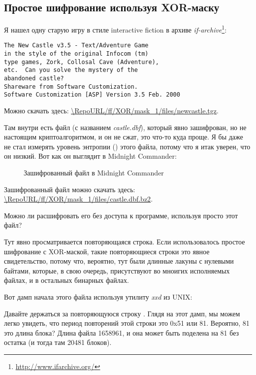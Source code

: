 \subsection{Простое шифрование используя XOR-маску}
\label{XOR_mask_1}

Я нашел одну старую игру в стиле interactive fiction в архиве \emph{if-archive}\footnote{\url{http://www.ifarchive.org/}}:

\begin{lstlisting}
The New Castle v3.5 - Text/Adventure Game
in the style of the original Infocom (tm)
type games, Zork, Collosal Cave (Adventure),
etc.  Can you solve the mystery of the
abandoned castle?
Shareware from Software Customization.
Software Customization [ASP] Version 3.5 Feb. 2000
\end{lstlisting}

Можно скачать здесь: \url{\RepoURL/ff/XOR/mask_1/files/newcastle.tgz}.

Там внутри есть файл (с названием \emph{castle.dbf}), который явно зашифрован, но не настоящим криптоалгоритмом,
и он не сжат, это что-то куда проще.
Я бы даже не стал измерять уровень энтропии () этого файла, потому что я итак уверен, что он низкий.
Вот как он выглядит в Midnight Commander:

\begin{figure}[H]
\centering
{}
\caption{Зашифрованный файл в Midnight Commander}
\end{figure}

Зашифрованный файл можно скачать здесь:
\url{\RepoURL/ff/XOR/mask_1/files/castle.dbf.bz2}.

Можно ли расшифровать его без доступа к программе, используя просто этот файл?

Тут явно просматривается повторяющаяся строка. 
Если использовалось простое шифрование с XOR-маской, такие повторяющиеся строки это явное свидетельство,
потому что, вероятно, тут были длинные лакуны с нулевыми байтами, которые, в свою очередь, присутствуют
во мноигих исполняемых файлах, и в остальных бинарных файлах.

Вот дамп начала этого файла используя утилиту \emph{xxd} из UNIX:



Давайте держаться за повторяющуюся строку .
Глядя на этот дамп, мы можем легко увидеть, что период повторений этой строки это 0x51 или 81.
Вероятно, 81 это длина блока?
Длина файла 1658961, и она может быть поделена на 81 без остатка (и тогда там 20481 блоков).

